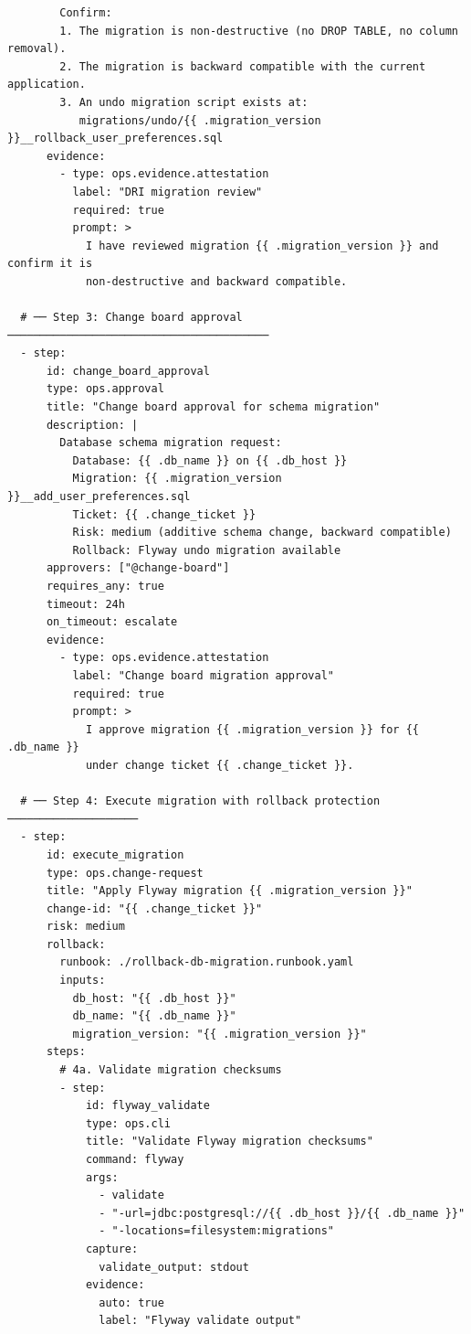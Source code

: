 \begin{verbatim}
        Confirm:
        1. The migration is non-destructive (no DROP TABLE, no column removal).
        2. The migration is backward compatible with the current application.
        3. An undo migration script exists at:
           migrations/undo/{{ .migration_version }}__rollback_user_preferences.sql
      evidence:
        - type: ops.evidence.attestation
          label: "DRI migration review"
          required: true
          prompt: >
            I have reviewed migration {{ .migration_version }} and confirm it is
            non-destructive and backward compatible.

  # ── Step 3: Change board approval ────────────────────────────────────────
  - step:
      id: change_board_approval
      type: ops.approval
      title: "Change board approval for schema migration"
      description: |
        Database schema migration request:
          Database: {{ .db_name }} on {{ .db_host }}
          Migration: {{ .migration_version }}__add_user_preferences.sql
          Ticket: {{ .change_ticket }}
          Risk: medium (additive schema change, backward compatible)
          Rollback: Flyway undo migration available
      approvers: ["@change-board"]
      requires_any: true
      timeout: 24h
      on_timeout: escalate
      evidence:
        - type: ops.evidence.attestation
          label: "Change board migration approval"
          required: true
          prompt: >
            I approve migration {{ .migration_version }} for {{ .db_name }}
            under change ticket {{ .change_ticket }}.

  # ── Step 4: Execute migration with rollback protection ────────────────────
  - step:
      id: execute_migration
      type: ops.change-request
      title: "Apply Flyway migration {{ .migration_version }}"
      change-id: "{{ .change_ticket }}"
      risk: medium
      rollback:
        runbook: ./rollback-db-migration.runbook.yaml
        inputs:
          db_host: "{{ .db_host }}"
          db_name: "{{ .db_name }}"
          migration_version: "{{ .migration_version }}"
      steps:
        # 4a. Validate migration checksums
        - step:
            id: flyway_validate
            type: ops.cli
            title: "Validate Flyway migration checksums"
            command: flyway
            args:
              - validate
              - "-url=jdbc:postgresql://{{ .db_host }}/{{ .db_name }}"
              - "-locations=filesystem:migrations"
            capture:
              validate_output: stdout
            evidence:
              auto: true
              label: "Flyway validate output"


\end{verbatim}
